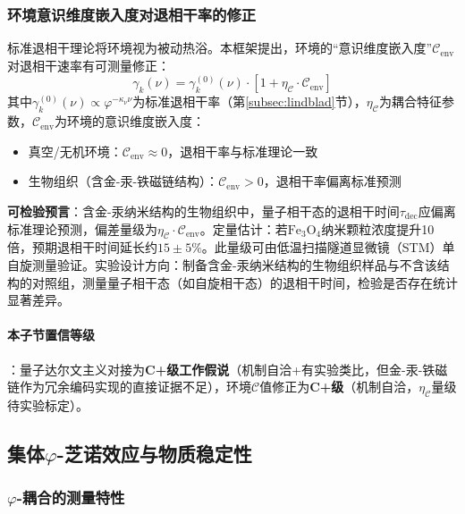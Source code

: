 \documentclass[12pt,a4paper,twocolumn]{article}
\renewcommand{\phi}{\varphi}
\begin{document}
\subsubsection{环境意识维度嵌入度对退相干率的修正}
\label{subsec:env_C_correction}

标准退相干理论将环境视为被动热浴。本框架提出，环境的``意识维度嵌入度''$\mathcal{C}_{\text{env}}$对退相干速率有可测量修正：
\begin{equation}
\gamma_k(\nu) = \gamma_k^{(0)}(\nu)\cdot\left[1 + \eta_\mathcal{C}\cdot\mathcal{C}_{\text{env}}\right]
\label{eq:env_C_correction}
\end{equation}
其中$\gamma_k^{(0)}(\nu) \propto \phi^{-\kappa_\nu\nu}$为标准退相干率（第\ref{subsec:lindblad}节），$\eta_\mathcal{C}$为耦合特征参数，$\mathcal{C}_{\text{env}}$为环境的意识维度嵌入度：
\begin{itemize}
\item 真空/无机环境：$\mathcal{C}_{\text{env}} \approx 0$，退相干率与标准理论一致
\item 生物组织（含金-汞-铁磁链结构）：$\mathcal{C}_{\text{env}} > 0$，退相干率偏离标准预测
\end{itemize}

\textbf{可检验预言}：含金-汞纳米结构的生物组织中，量子相干态的退相干时间$\tau_{\text{dec}}$应偏离标准理论预测，偏差量级为$\eta_\mathcal{C}\cdot\mathcal{C}_{\text{env}}$。定量估计：若$\text{Fe}_3\text{O}_4$纳米颗粒浓度提升10倍，预期退相干时间延长约$15\pm5\%$。此量级可由低温扫描隧道显微镜（STM）单自旋测量验证。实验设计方向：制备含金-汞纳米结构的生物组织样品与不含该结构的对照组，测量量子相干态（如自旋相干态）的退相干时间，检验是否存在统计显著差异。

\paragraph{本子节置信等级}：量子达尔文主义对接为\textbf{C+级工作假说}（机制自洽+有实验类比，但金-汞-铁磁链作为冗余编码实现的直接证据不足），环境$\mathcal{C}$值修正为\textbf{C+级}（机制自洽，$\eta_\mathcal{C}$量级待实验标定）。

\subsection{集体$\phi$-芝诺效应与物质稳定性}
\label{sec:zeno}

\subsubsection{$\phi$-耦合的测量特性}
\end{document}

